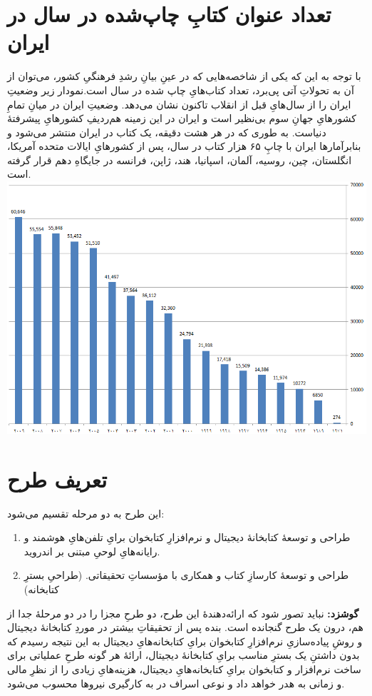 \documentclass[]{article}
\begin{document}
\section{تعداد عنوان کتابِ چاپ‌شده در سال در ایران}
با توجه به این که یکی از شاخصه‌هایی که در عینِ بیانِ رشدِ فرهنگیِ کشور، می‌توان از آن به تحولاتِ آتی پی‌برد، تعداد کتاب‌هایِ چاپ شده در سال است.نمودار زیر وضعیتِ ایران را از سال‌هایِ قبل از انقلاب تاکنون نشان می‌دهد. وضعیتِ ایران در میانِ تمامِ کشورهایِ جهانِ سوم بی‌نظیر است و ایران در این زمینه هم‌ردیفِ کشورهایِ پیشرفتهٔ دنیاست. به طوری که در هر هشت دقیقه، یک کتاب در ایران منتشر می‌شود و بنابرآمارها ایران با چاپِ ۶۵ هزار کتاب در سال، پس از کشورهایِ ايالات متحده آمريكا، انگلستان، چين، روسيه، آلمان، اسپانيا، هند، ژاپن، فرانسه در جایگاهِ دهم قرار گرفته است.
\nocite{Doe:2009:Other,
Doe:2009:Misc,
Doe:2009:Booklet}
\includegraphics[scale=0.40]{books-of-iran.png}

\section{تعریف طرح}
این طرح به دو مرحله تقسیم می‌شود:
\begin{enumerate}
	\item طراحی و توسعهٔ کتابخانهٔ دیجیتال و نرم‌افزارِ کتابخوان برایِ تلفن‌هایِ هوشمند و رایانه‌هایِ لوحیِ مبتنی بر اندروید.
	\item طراحی و توسعهٔ کارسازِ کتاب و همکاری با مؤسساتِ تحقیقاتی. (طراحیِ بسترِ کتابخانه)
\end{enumerate}
\textbf{گوشزد:}
نباید تصور شود که ارائه‌دهندهٔ این طرح، دو طرحِ مجزا را در دو مرحلهٔ جدا از هم، درون یک طرح گنجانده است. بنده پس از تحقیقاتِ بیشتر در موردِ کتابخانهٔ دیجیتال و روشِ پیاده‌سازیِ نرم‌افزارِ کتابخوان برایِ کتابخانه‌هایِ دیجیتال به این نتیجه رسیدم که بدون داشتنِ یک بسترِ مناسب برایِ کتابخانهٔ دیجیتال، ارائهٔ هر گونه طرحِ عملیاتی برای ساخت نرم‌افزار و کتابخوان برایِ کتابخانه‌هایِ دیجیتال، هزینه‌هایِ زیادی را از نظرِ مالی و زمانی به هدر خواهد داد و نوعی اسراف در به کارگیری نیروها محسوب می‌شود.
\end{document}
